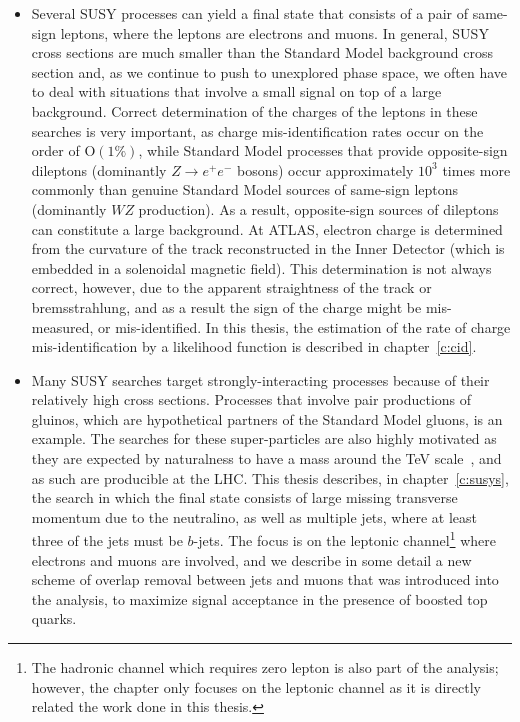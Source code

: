 \begin{itemize}

	\item Several SUSY processes can yield a final state that consists of a pair of
	      same-sign leptons, where the leptons are electrons and muons. In general, SUSY
	      cross sections are much smaller than the Standard Model background cross
	      section and, as we continue to push to unexplored phase space, we often have to
	      deal with situations that involve a small signal on top of a large background.
	      Correct determination of the charges of the leptons in these searches is very
	      important, as charge mis-identification rates occur on the order of
	      $\text{O}(1\%)$, while Standard Model processes that provide opposite-sign
	      dileptons (dominantly $Z\to e^+e^-$ bosons) occur approximately $10^3$ times
	      more commonly than genuine Standard Model sources of same-sign leptons
	      (dominantly $WZ$ production). As a result, opposite-sign sources of dileptons
	      can constitute a large background. At ATLAS, electron charge
	      is determined from the curvature of the track reconstructed in the Inner
	      Detector (which is embedded in a solenoidal magnetic field). This determination
	      is not always correct, however, due to the apparent straightness of the track or
	      bremsstrahlung, and as a result the sign of the charge might be mis-measured,
	      or mis-identified. In this thesis, the estimation of the rate of charge
	      mis-identification by a likelihood function is described in
	      chapter~\ref{c:cid}.

	\item Many SUSY searches target strongly-interacting processes because of their
	      relatively high cross sections. Processes that involve pair productions of
	      gluinos, which are hypothetical partners of the Standard Model gluons, is an
	      example. The searches for these super-particles are also highly motivated as
	      they are expected by naturalness to have a mass around the TeV
	      scale~\cite{Barbieri:1987fn}, and as such are producible at the LHC. This
	      thesis describes, in chapter~\ref{c:susys}, the search in which the final state
	      consists of large missing transverse momentum due to the neutralino, as well as
	      multiple jets, where at least three of the jets must be $b$-jets. The focus is
	      on the leptonic channel\footnote{The hadronic channel which requires zero
		      lepton is also part of the analysis; however, the chapter only focuses on the
		      leptonic channel as it is directly related the work done in this thesis.} where
	      electrons and muons are involved, and we describe in some detail a new scheme
	      of overlap removal between jets and muons that was introduced into the
	      analysis, to maximize signal acceptance in the presence of boosted top quarks.


\end{itemize}

